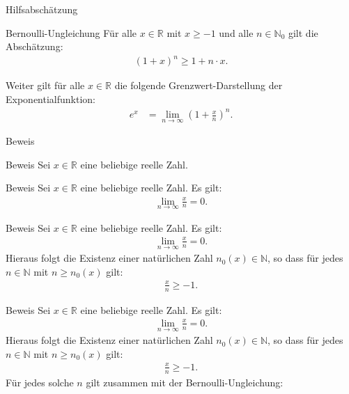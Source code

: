 \documentclass[10pt]{beamer}
\def\bN{\mathbb{N}}
\def\bR{\mathbb{R}}
\begin{document}
\begin{frame}{Hilfsabschätzung}
    \begin{block}{Bernoulli-Ungleichung}
        Für alle \( x \in \bR \) mit \( x \geq - 1 \) und alle \( n \in \bN_{0} \) gilt die Abschätzung:
        \begin{align*}
            \left( 1 + x \right)^{n}
            \geq 1 + n \cdot x.
        \end{align*}
    \end{block}
    Weiter gilt für alle \( x \in \bR \) die folgende Grenzwert-Darstellung der Exponentialfunktion:
    \begin{align*}
        e^{x} 
        & = \lim_{n \to \infty} \left( 1 + \frac{x}{n} \right)^{n}.
    \end{align*}
\end{frame}



\begin{frame}{Beweis}
    
\end{frame}



\begin{frame}{Beweis}
    Sei \( x \in \bR \) eine beliebige reelle Zahl.
\end{frame}



\begin{frame}{Beweis}
    Sei \( x \in \bR \) eine beliebige reelle Zahl. Es gilt:
    \begin{align*}
        \lim_{n \to \infty} \frac{x}{n} = 0. 
    \end{align*}
\end{frame}



\begin{frame}{Beweis}
    Sei \( x \in \bR \) eine beliebige reelle Zahl. Es gilt:
    \begin{align*}
        \lim_{n \to \infty} \frac{x}{n} = 0. 
    \end{align*}
    Hieraus folgt die Existenz einer natürlichen Zahl \( n_{0}(x) \in \bN \), so dass für jedes \( n \in \bN \) mit \( n \geq n_{0}(x) \) gilt:
    \begin{align*}
        \frac{x}{n} 
        \geq - 1.
    \end{align*}
\end{frame}



\begin{frame}{Beweis}
    Sei \( x \in \bR \) eine beliebige reelle Zahl. Es gilt:
    \begin{align*}
        \lim_{n \to \infty} \frac{x}{n} = 0. 
    \end{align*}
    Hieraus folgt die Existenz einer natürlichen Zahl \( n_{0}(x) \in \bN \), so dass für jedes \( n \in \bN \) mit \( n \geq n_{0}(x) \) gilt:
    \begin{align*}
        \frac{x}{n} 
        \geq - 1.
    \end{align*}
    Für jedes solche \( n \) gilt zusammen mit der Bernoulli-Ungleichung:
\end{frame}
\end{document}
